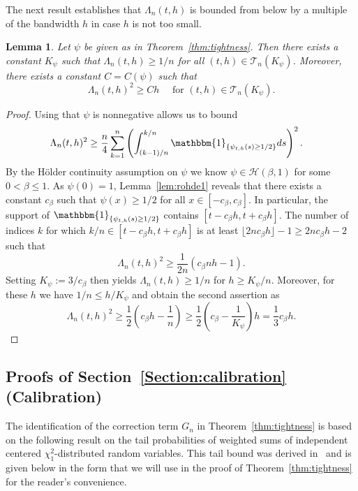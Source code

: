 \documentclass[10.5pt,letter]{article}
\numberwithin{equation}{section}
\newtheorem{lemma}[theorem]{Lemma}
\theoremstyle{definition}
\newcommand{\1}{\mathbbm{1}}
\begin{document}
The next result establishes that $\Lambda_n(t,h)$ is bounded from below by a multiple of the bandwidth $h$ in case $h$ is not too small. 

\begin{lemma}\label{lemma:sigmageq}
Let $\psi$ be given as in Theorem~\ref{thm:tightness}. Then there exists a constant $K_\psi$ such that $\Lambda_n(t,h)\geq 1/n$ for all $(t,h)\in\mathcal{T}_n(K_\psi)$. Moreover, there exists a constant $C=C(\psi)$ such that
$$ \Lambda_n(t,h)^2 \geq Ch  \quad\textrm{ for } (t,h)\in\mathcal{T}_n(K_\psi).$$
\end{lemma}


\begin{proof}
Using that $\psi$ is nonnegative allows us to bound 
\begin{align*}
    \Lambda_n(t,h)^2 & \geq \frac{n}{4}\sum_{k=1}^n  \left(\int_{(k-1)/n}^{k/n}\1_{\{ \psi_{t,h}(s)  \geq 1/2 \}}ds\right)^2 .
\end{align*}
By the Hölder continuity assumption on $\psi$ we know $\psi\in\mathcal{H}(\beta,1)$ for some $0<\beta\leq 1$. As $\psi(0)=1$, Lemma~\ref{lem:rohde1} reveals that there exists a constant $c_\beta$ such that $\psi(x)\geq 1/2$ for all $x\in [-c_\beta,c_\beta]$. In particular, the support of $\1_{\{  \psi_{t,h}(s) \geq 1/2 \}}$ contains $[t-c_\beta h, t+c_\beta h]$. The number of indices $k$ for which $k/n\in [t-c_\beta h, t+c_\beta h]$ is at least $ \lfloor 2nc_\beta h \rfloor -1 \geq  2nc_\beta h-2 $ such that
\[ \Lambda_n(t,h)^2 \geq \frac{1}{2n}\left( c_\beta nh - 1\right). \]
Setting $K_\psi:= 3/c_\beta$ then yields $\Lambda_n(t,h)\geq 1/n$ for $h\geq K_\psi/n$. Moreover, 
for these $h$ we have $1/n\leq h/K_\psi$ and obtain the second assertion as
\[ \Lambda_n(t,h)^2 \geq \frac12 \left( c_\beta h - \frac1n\right) \geq \frac12\left( c_\beta -\frac{1}{K_\psi}\right) h = \frac13 c_{\beta} h.\]
\end{proof} 




\subsection{Proofs of Section~\ref{Section:calibration} (Calibration)}\label{Subsection:proof_calibration}

The identification of the correction term $G_n$ in Theorem~\ref{thm:tightness} is based on the following result on the tail probabilities of weighted sums of independent centered $\chi_1^2$-distributed random variables. This tail bound was derived in~\cite{Massart} and is given below in the form that we will use in the proof of Theorem~\ref{thm:tightness} for the reader's convenience.
\end{document}
